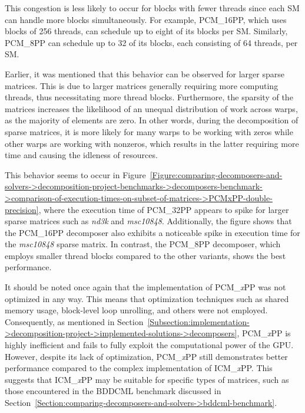 This congestion is less likely to occur for blocks with fewer threads since each SM can handle more blocks simultaneously. For example, PCM\_16PP, which uses blocks of 256 threads, can schedule up to eight of its blocks per SM. Similarly, PCM\_8PP can schedule up to 32 of its blocks, each consisting of 64 threads, per SM.

Earlier, it was mentioned that this behavior can be observed for larger sparse matrices. This is due to larger matrices generally requiring more computing threads, thus necessitating more thread blocks. Furthermore, the sparsity of the matrices increases the likelihood of an unequal distribution of work across warps, as the majority of elements are zero. In other words, during the decomposition of sparse matrices, it is more likely for many warps to be working with zeros while other warps are working with nonzeros, which results in the latter requiring more time and causing the idleness of resources.

This behavior seems to occur in Figure~\ref{Figure:comparing-decomposers-and-solvers->decomposition-project-benchmarks->decomposers-benchmark->comparison-of-execution-times-on-subset-of-matrices->PCMxPP-double-precision}, where the execution time of PCM\_32PP appears to spike for larger sparse matrices such as \textit{nd3k} and \textit{msc10848}. Additionally, the figure shows that the PCM\_16PP decomposer also exhibits a noticeable spike in execution time for the \textit{msc10848} sparse matrix. In contrast, the PCM\_8PP decomposer, which employs smaller thread blocks compared to the other variants, shows the best performance.

It should be noted once again that the implementation of PCM\_\textit{x}PP was not optimized in any way. This means that optimization techniques such as shared memory usage, block-level loop unrolling, and others were not employed. Consequently, as mentioned in Section~\ref{Subsection:implementation->decomposition-project->implemented-solutions->decomposers}, PCM\_\textit{x}PP is highly inefficient and fails to fully exploit the computational power of the GPU. However, despite its lack of optimization, PCM\_\textit{x}PP still demonstrates better performance compared to the complex implementation of ICM\_\textit{x}PP. This suggests that ICM\_\textit{x}PP may be suitable for specific types of matrices, such as those encountered in the BDDCML benchmark discussed in Section~\ref{Section:comparing-decomposers-and-solvers->bddcml-benchmark}.

